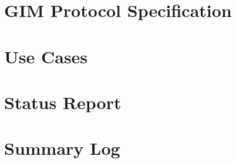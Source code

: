 \appendix
\chapter{GIM Protocol Specification}


\chapter{Use Cases}


\chapter{Status Report}


\chapter{Summary Log}

